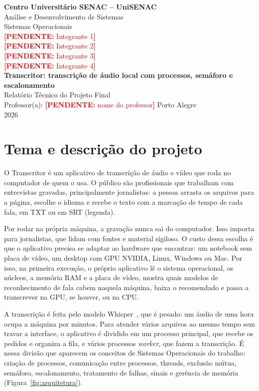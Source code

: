 \documentclass[12pt,a4paper]{article}
\newcommand{\pendente}[1]{\textcolor{red}{\textbf{[PENDENTE:} #1\textbf{]}}}
\newcommand{\titulo}{Transcritor: transcrição de áudio local com processos, semáforo e escalonamento}
\newcommand{\professor}{\pendente{nome do professor}}
\begin{document}
\begin{titlepage}
  \centering
  {\large\textbf{Centro Universitário SENAC -- UniSENAC}}\\[0.3cm]
  {\large Análise e Desenvolvimento de Sistemas}\\[0.3cm]
  {\large Sistemas Operacionais}\\[3cm]
  {\large
    \pendente{Integrante 1}\\
    \pendente{Integrante 2}\\
    \pendente{Integrante 3}\\
    \pendente{Integrante 4}\\
  }
  \vfill
  {\LARGE\textbf{\titulo}}\\[0.8cm]
  {\large Relatório Técnico do Projeto Final}\\[0.5cm]
  {\large Professor(a): \professor}
  \vfill
  {\large Porto Alegre}\\
  {\large 2026}
\end{titlepage}

\tableofcontents
\newpage

\section{Tema e descrição do projeto}

O Transcritor é um aplicativo de transcrição de áudio e vídeo que roda no computador de
quem o usa. O público são profissionais que trabalham com entrevistas gravadas, principalmente
jornalistas: a pessoa arrasta os arquivos para a página, escolhe o idioma e recebe o texto
com a marcação de tempo de cada fala, em TXT ou em SRT (legenda).

Por rodar na própria máquina, a gravação nunca sai do computador. Isso importa para
jornalistas, que lidam com fontes e material sigiloso. O custo dessa escolha é que o
aplicativo precisa se adaptar ao hardware que encontrar: um notebook sem placa de vídeo, um
desktop com GPU NVIDIA, Linux, Windows ou Mac. Por isso, na primeira execução, o próprio
aplicativo lê o sistema operacional, os núcleos, a memória RAM e a placa de vídeo, mostra
quais modelos de reconhecimento de fala cabem naquela máquina, baixa o recomendado e passa a
transcrever na GPU, se houver, ou na CPU.

A transcrição é feita pelo modelo Whisper~\cite{whisper}, que é pesado: um áudio de uma hora
ocupa a máquina por minutos. Para atender vários arquivos ao mesmo tempo sem travar a
interface, o aplicativo é dividido em um processo principal, que recebe os pedidos e
organiza a fila, e vários processos \emph{worker}, que fazem a transcrição. É nessa divisão que
aparecem os conceitos de Sistemas Operacionais do trabalho: criação de processos,
comunicação entre processos, threads, exclusão mútua, semáforo, escalonamento,
tratamento de falhas, sinais e gerência de memória (Figura~\ref{fig:arquitetura}).
\end{document}
